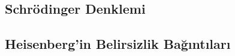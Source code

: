 \documentclass[a4paper,12pt, twoside]{article}
\begin{document}
\subsection{Schrödinger Denklemi}


\subsection{Heisenberg'in Belirsizlik Bağıntıları}



\newpage
\renewcommand\refname{Kaynaklar}
{}
 
\end{document}
